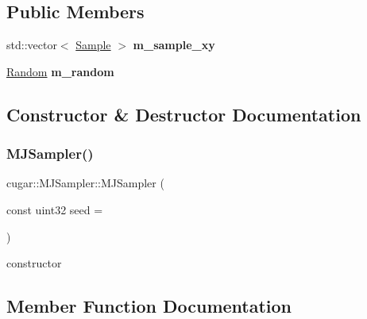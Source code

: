 \subsection*{Public Members}
\begin{DoxyCompactItemize}
\item 
\mbox{\label{structcugar_1_1_m_j_sampler_a8d445204f040b6e50070c339d0e4257f}} 
std\+::vector$<$ \hyperlink{structcugar_1_1_m_j_sampler_1_1_sample}{Sample} $>$ {\bfseries m\+\_\+sample\+\_\+xy}
\item 
\mbox{\label{structcugar_1_1_m_j_sampler_a9304a7026ebb616bc15ea4112ed1092c}} 
\hyperlink{structcugar_1_1_random}{Random} {\bfseries m\+\_\+random}
\end{DoxyCompactItemize}


\subsection{Constructor \& Destructor Documentation}
\mbox{\label{structcugar_1_1_m_j_sampler_a8863e570f5124b717e6c15743f231921}} 
\subsubsection{\texorpdfstring{M\+J\+Sampler()}{MJSampler()}}
{\footnotesize\ttfamily cugar\+::\+M\+J\+Sampler\+::\+M\+J\+Sampler (\begin{DoxyParamCaption}\item[{const uint32}]{seed = {} }\end{DoxyParamCaption})\hspace{0.3cm}{\ttfamily [inline]}}

constructor 

\subsection{Member Function Documentation}
\mbox{\label{structcugar_1_1_m_j_sampler_a4f7493268a06f465bd0d25bba662e3eb}} 
